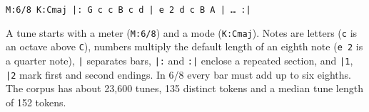\begin{center}
\texttt{M:6/8 K:Cmaj |: G c c B c d | e 2 d c B A | \dots{} :|}
\end{center}

A tune starts with a meter (\texttt{M:6/8}) and a mode (\texttt{K:Cmaj}). Notes are letters (\texttt{c} is an
octave above \texttt{C}), numbers multiply the default length of an eighth note (\texttt{e 2} is a quarter note),
\texttt{|} separates bars, \texttt{|:} and \texttt{:|} enclose a repeated section, and \texttt{|1}, \texttt{|2}
mark first and second endings. In 6/8 every bar must add up to six eighths. The corpus has about 23{,}600 tunes,
135 distinct tokens and a median tune length of 152 tokens.

